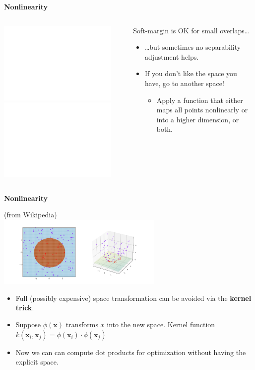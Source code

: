 \documentclass{beamer}
\newcommand{\pagestepalt}[2]{
  \begin{frame}[t]
    \begin{minipage}[t][0.26\textheight][t]{\textwidth}
      \begin{center}
        \huge
        \textbf{#1}
      \end{center}
    \end{minipage}
    
    \begin{minipage}[t][0.7\textheight][c]{\textwidth}
      #2
    \end{minipage}
  \end{frame}
}
\begin{document}
\pagestepalt{Nonlinearity}{
  \begin{columns}[T]
    \begin{column}{0.49\textwidth}
      \begin{center}
        \includegraphics<1>[width=0.9\textwidth]{linsep5.pdf}
        \includegraphics<2->[width=0.9\textwidth]{linsep6.pdf}
      \end{center}
    \end{column}

    \begin{column}{0.49\textwidth}
      Soft-margin is OK for small overlaps\ldots\pause
      \begin{itemize}
      \item \ldots but sometimes no separability adjustment helps.\pause
      \item If you don't like the space you have, go to another space!
        \begin{itemize}
        \item Apply a function that either maps all points nonlinearly
          or into a higher dimension, or both.
        \end{itemize}
      \end{itemize}
    \end{column}
  \end{columns}
}

\pagestepalt{Nonlinearity}{
  \begin{center}
    {\tiny (from Wikipedia)}\\
    \includegraphics[width=0.6\textwidth]{kerneltrick.png}
  \end{center}
  \vspace{-0.5cm}
  \begin{itemize}
  \item Full (possibly expensive) space transformation can be avoided
    via the \textbf{kernel trick}.\pause
  \item Suppose $\phi(\mathbf{x})$ transforms $x$ into the new space. Kernel
    function $k(\mathbf{x}_i, \mathbf{x}_j) = \phi(\mathbf{x}_i) \cdot \phi(\mathbf{x}_j)$\pause
  \item Now we can can compute dot products for optimization without having the explicit space.
  \end{itemize}
}
\end{document}
